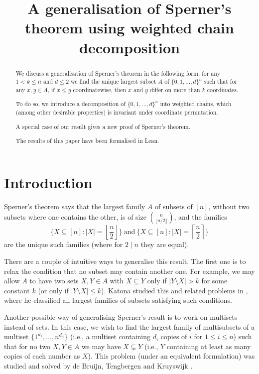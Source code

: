 \documentclass[11pt, reqno]{amsart}
\title{A generalisation of Sperner's theorem using weighted chain decomposition}
\theoremstyle{remark}
\numberwithin{equation}{section}
\newcommand{\thehypercube}{\{0, 1, \ldots, d\}^n}
\begin{document}
\begin{abstract}
    We discuss a generalisation of Sperner's theorem in the following form: for any $1 < k \leqslant n$ and $d \leqslant 2$ we find the unique largest subset $A$ of $\thehypercube$ such that for any $x, y \in A$, if $x \leqslant y$ coordinatewise, then $x$ and $y$ differ on more than $k$ coordinates.

    To do so, we introduce a decomposition of $\thehypercube$ into weighted chains, which (among other desirable properties) is invariant under coordinate permutation.

    A special case of our result gives a new proof of Sperner's theorem.

    The results of this paper have been formalised in Lean.
\end{abstract}

\maketitle

\section{Introduction}

Sperner's theorem \cite{sperner} says that the largest family $A$ of subsets of $[n]$, without two subsets where one contains the other, is of size $\binom{n}{\lfloor n/2 \rfloor}$, and the families
\begin{equation*}
    \big\{X \subseteq [n]: \vert X\vert = \left\lfloor \frac{n}{2} \right\rfloor\big\} \ \text{and} \ \big\{X \subseteq [n]: \vert X\vert = \left\lceil \frac{n}{2} \right\rceil\big\}
\end{equation*}
are the unique such families (where for $2 \mid n$ they are equal).

There are a couple of intuitive ways to generalise this result. The first one is to relax the condition that no subset may contain another one. For example, we may allow $A$ to have two sets $X, Y \in A$ with $X \subseteq Y$ only if $\vert Y \setminus X \vert > k$ for some constant $k$ (or only if $\vert Y \setminus X \vert \leqslant k$). Katona studied this and related problems in \cite{katona}, where he classified all largest families of subsets satisfying such conditions.

Another possible way of generalising Sperner's result is to work on multisets instead of sets. In this case, we wish to find the largest family of multisubsets of a multiset $\{1^{d_1}, \ldots, n^{d_n}\}$ (i.e., a multiset containing $d_i$ copies of $i$ for $1 \leqslant i \leqslant n$) such that for no two $X, Y \in A$ we may have $X \subsetneq Y$ (i.e., $Y$ containing at least as many copies of each number as $X$). This problem (under an equivalent formulation) was studied and solved by de Bruijn, Tengbergen and Kruyswijk \cite{symmetric_chain_decomposition}.
\end{document}
